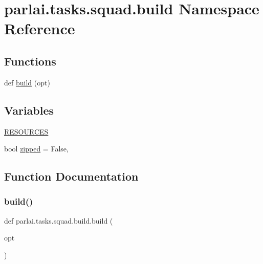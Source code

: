 \hypertarget{namespaceparlai_1_1tasks_1_1squad_1_1build}{}\section{parlai.\+tasks.\+squad.\+build Namespace Reference}
\label{namespaceparlai_1_1tasks_1_1squad_1_1build}
\subsection*{Functions}
\begin{DoxyCompactItemize}
\item 
def \hyperlink{namespaceparlai_1_1tasks_1_1squad_1_1build_aaf903c1fa0ac0b6cd2e9eb37d5d001a1}{build} (opt)
\end{DoxyCompactItemize}
\subsection*{Variables}
\begin{DoxyCompactItemize}
\item 
\hyperlink{namespaceparlai_1_1tasks_1_1squad_1_1build_a61589d585f7e9b43934aadf6ad9480f5}{R\+E\+S\+O\+U\+R\+C\+ES}
\item 
bool \hyperlink{namespaceparlai_1_1tasks_1_1squad_1_1build_a0d83c96a6ba49e4b7d574443c5143c52}{zipped} = False,
\end{DoxyCompactItemize}


\subsection{Function Documentation}
\mbox{\label{namespaceparlai_1_1tasks_1_1squad_1_1build_aaf903c1fa0ac0b6cd2e9eb37d5d001a1}} 
\subsubsection{\texorpdfstring{build()}{build()}}
{\footnotesize\ttfamily def parlai.\+tasks.\+squad.\+build.\+build (\begin{DoxyParamCaption}\item[{}]{opt }\end{DoxyParamCaption})}



